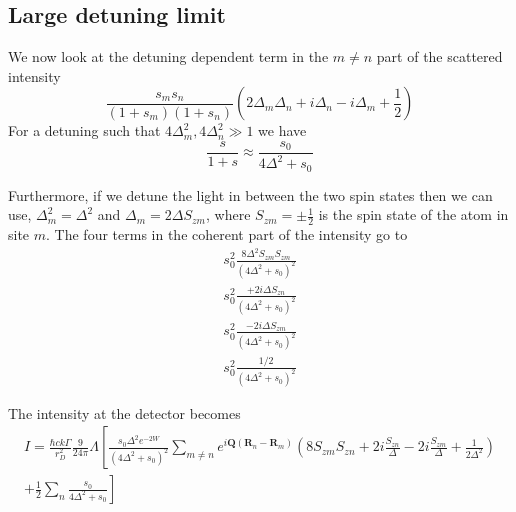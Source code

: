 \documentclass[11pt,letter]{article}
\newcommand{\bv}[1]{\ensuremath{\bm{#1}}}
\begin{document}
\subsection{ Large detuning limit}

We now look at the detuning dependent term in the $m\neq n$ part of the
scattered intensity 
\begin{equation}
    \frac{ s_{m} s_{n} } { ( 1+s_{m} )( 1+s_{n} ) }
    \left(
        2\Delta_{m} \Delta_{n}  
      + i  \Delta_{n} 
      - i  \Delta_{m} 
      + \frac{1}{2}  
    \right)
\end{equation}  
For a detuning such that $4\Delta_{m}^{2}, 4\Delta_{n}^{2} \gg 1 $ we have
\begin{equation}
  \frac{s}{1+s} \approx \frac{ s_{0} }
                             { 4 \Delta^{2} + s_{0} }
\end{equation}

Furthermore, if we detune the light in between the two spin states then we can
use, $\Delta_{m}^{2} = \Delta^{2}$ and  $\Delta_{m} = 2\Delta S_{zm}$, where
$S_{zm}=\pm\frac{1}{2}$ is the spin state of the atom in site $m$.  The four terms in the coherent part of the intensity go to 
\begin{align} 
      s_{0}^{2}\frac{   8  \Delta^{2} S_{zm}S_{zm}  } 
           {(4 \Delta^{2} + s_{0})^{2}  }  
      \\
      s_{0}^{2}\frac{ + 2 i \Delta S_{zn} } 
           {(4 \Delta^{2} + s_{0})^{2}  }  
      \\
     s_{0}^{2} \frac{ - 2 i \Delta S_{zm} } 
           {(4 \Delta^{2} + s_{0})^{2}  }  
      \\
     s_{0}^{2} \frac{ 1/2} 
           {(4 \Delta^{2} + s_{0})^{2}  }  
\end{align}

The intensity at the detector becomes
\begin{multline}
 I  = 
 \frac{\hbar c k \Gamma}{r_{D}^{2}}  
    \frac{9}{24\pi} \Lambda \left[ 
    \frac{  s_{0} \Delta^{2} e^{-2W}}
           {(4 \Delta^{2} + s_{0})^{2}  } 
  \sum_{m\neq n} 
       e^{ i \bv{Q}( \bv{R}_{n} - \bv{R}_{m} ) }  
    \left(  8 S_{zm}S_{zn}  +  2 i \frac{ S_{zn}}{\Delta} 
            - 2 i \frac{ S_{zm} }{\Delta} +  \frac{ 1}{2\Delta^{2}} 
   \right) 
    \right. \\ \left.
   +  \frac{1}{2}\sum_{n}  \frac{ s_{0} } 
                                               { 4\Delta^{2} + s _{0} } 
  \right]
\end{multline}
\end{document}
